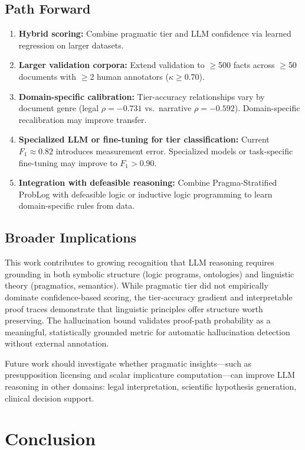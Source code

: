 \documentclass[11pt,letterpaper]{article}
\begin{document}
\subsection{Path Forward}

\begin{enumerate}
  \item \textbf{Hybrid scoring:} Combine pragmatic tier and LLM confidence via learned regression on larger datasets.
  \item \textbf{Larger validation corpora:} Extend validation to $\geq$500 facts across $\geq$50 documents with $\geq$2 human annotators ($\kappa\geq0.70$).
  \item \textbf{Domain-specific calibration:} Tier-accuracy relationships vary by document genre (legal $\rho=-0.731$ vs.\ narrative $\rho=-0.592$). Domain-specific recalibration may improve transfer.
  \item \textbf{Specialized LLM or fine-tuning for tier classification:} Current $F_1\approx0.82$ introduces measurement error. Specialized models or task-specific fine-tuning may improve to $F_1>0.90$.
  \item \textbf{Integration with defeasible reasoning:} Combine Pragma-Stratified ProbLog with defeasible logic or inductive logic programming to learn domain-specific rules from data.
\end{enumerate}

\subsection{Broader Implications}

This work contributes to growing recognition that LLM reasoning requires grounding in both symbolic structure (logic programs, ontologies) and linguistic theory (pragmatics, semantics). While pragmatic tier did not empirically dominate confidence-based scoring, the tier-accuracy gradient and interpretable proof traces demonstrate that linguistic principles offer structure worth preserving. The hallucination bound validates proof-path probability as a meaningful, statistically grounded metric for automatic hallucination detection without external annotation.

Future work should investigate whether pragmatic insights---such as presupposition licensing and scalar implicature computation---can improve LLM reasoning in other domains: legal interpretation, scientific hypothesis generation, clinical decision support.

\section{Conclusion}
\label{sec:conclusion}
\end{document}
